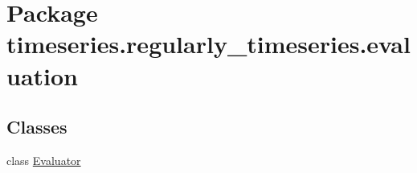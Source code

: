 \hypertarget{namespacetimeseries_1_1regularly__timeseries_1_1evaluation}{}\section{Package timeseries.\+regularly\+\_\+timeseries.\+evaluation}
\label{namespacetimeseries_1_1regularly__timeseries_1_1evaluation}
\subsection*{Classes}
\begin{DoxyCompactItemize}
\item 
class \hyperlink{classtimeseries_1_1regularly__timeseries_1_1evaluation_1_1_evaluator}{Evaluator}
\end{DoxyCompactItemize}
